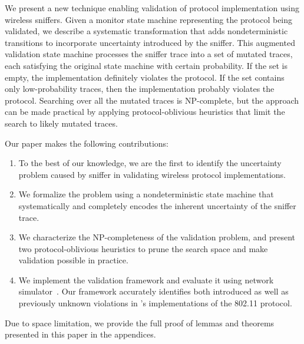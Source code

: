 We present a new technique enabling validation of protocol implementation using
wireless sniffers. Given a monitor state machine representing the protocol being
validated, we describe a systematic transformation that adds nondeterministic
transitions to incorporate uncertainty introduced by the sniffer.  This
augmented validation state machine processes the sniffer trace into a set of
mutated traces, each satisfying the original state machine with certain
probability.  If the set is empty, the implementation definitely violates the
protocol.  If the set contains only low-probability traces, then the
implementation probably violates the protocol.  Searching over all the mutated
traces is NP-complete, but the approach can be made practical by applying
protocol-oblivious heuristics that limit the search to likely mutated traces.

Our paper makes the following contributions:
\begin{enumerate}
		  \item To the best of our knowledge, we are the first to identify the
    uncertainty problem caused by sniffer in validating wireless protocol
    implementations.
		  \item We formalize the problem using a nondeterministic state machine that
    systematically and completely encodes the inherent uncertainty of the
    sniffer trace.
		    \item We characterize the NP-completeness of the validation problem, and
      present two protocol-oblivious heuristics to prune the search
      space and make validation possible in practice.
			\item We implement the validation framework and evaluate it using
    \ns{} network simulator~\cite{riley2010ns}.
		    Our framework accurately identifies both introduced as well as previously
    unknown violations in \ns{}'s implementations of the 802.11 protocol.
\end{enumerate}

Due to space limitation, we provide the full proof of lemmas and theorems
presented in this paper in the appendices.

\begin{comment}
The rest of this paper is organized as follows.
We motivate the uncertainty problem in Section~\ref{sec:model}.
We then formally describe the problem in Section~\ref{sec:framework},
including the completeness of the augmentation (\S~\ref{subsec:augment}),
hardness analysis (\S~\ref{subsec:hard}) and search algorithms
(\S~\ref{subsec:search}).
We continue by evaluating our framework through two case studies in
Section~\ref{sec:case}.  Finally, we present related works in
Section~\ref{sec:related} and concludes in Section~\ref{sec:conclusion}.
\end{comment}
